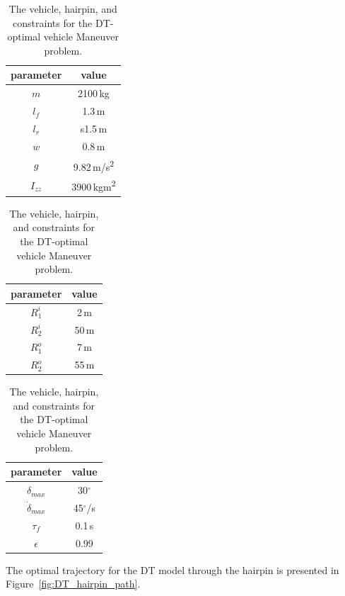 \begin{table}[h!]
    \begin{subtable}{0.3\textwidth}
        \begin{tabular}{c|c}
            parameter & value\\
            \hline
            $m$ & 2100\,kg\\
            $l_f$ & 1.3\,m \\     
            $l_r$ & s1.5\,m \\
            $w$ & 0.8\,m\\
            $g$ & 9.82\,m/s\textsuperscript{2}\\
            $I_{zz}$ & 3900\,kgm\textsuperscript{2}\\
        \end{tabular}
        \caption{Vehicle parameters}
    \end{subtable}
    \hfill
    \begin{subtable}{0.3\textwidth}
        \begin{tabular}{c|c}
            parameter & value\\
            \hline
            $R_1^i$ & 2\,m \\
            $R_2^i$ & 50\,m \\
            $R_1^o$ & 7\,m \\
            $R_2^o$ & 55\,m \\
        \end{tabular}
        \caption{Hairpin parameters}
    \end{subtable}
    \hfill
    \begin{subtable}{0.3\textwidth}
        \begin{tabular}{c|c}
            parameter & value\\
            \hline
            $\delta_{max}$ & 30$^\circ$ \\
            $\dot\delta_{max}$ & 45$^\circ$/s \\
            $\tau_f$ & 0.1\,s\\
            $\epsilon$ & 0.99\\
        \end{tabular}
        \caption{Constrains}
    \end{subtable}
    \caption{The vehicle, hairpin, and constraints for the DT-optimal vehicle Maneuver problem.}
    \label{tab:ocp_prob2}
\end{table}

The optimal trajectory for the DT model through the hairpin is presented in Figure~\ref{fig:DT_hairpin_path}. 

